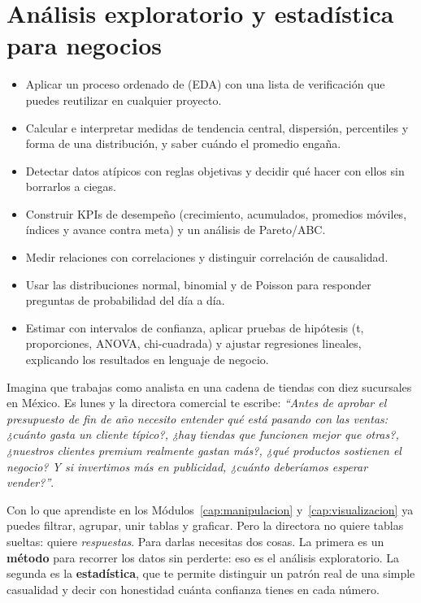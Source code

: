 \chapter{Análisis exploratorio y estadística para negocios}
\label{cap:eda}

\begin{objetivos}
\begin{itemize}
  \item Aplicar un proceso ordenado de 
        (EDA) con una lista de verificación que puedes reutilizar en cualquier
        proyecto.
  \item Calcular e interpretar medidas de tendencia central, dispersión,
        percentiles y forma de una distribución, y saber cuándo el promedio
        engaña.
  \item Detectar datos atípicos con reglas objetivas y decidir qué hacer con
        ellos sin borrarlos a ciegas.
  \item Construir KPIs de desempeño (crecimiento, acumulados, promedios
        móviles, índices y avance contra meta) y un análisis de Pareto/ABC.
  \item Medir relaciones con correlaciones y distinguir correlación de
        causalidad.
  \item Usar las distribuciones normal, binomial y de Poisson para responder
        preguntas de probabilidad del día a día.
  \item Estimar con intervalos de confianza, aplicar pruebas de hipótesis
        (t, proporciones, ANOVA, chi-cuadrada) y ajustar regresiones lineales,
        explicando los resultados en lenguaje de negocio.
\end{itemize}
\end{objetivos}

Imagina que trabajas como analista en una cadena de tiendas con diez
sucursales en México. Es lunes y la directora comercial te escribe:
\emph{``Antes de aprobar el presupuesto de fin de año necesito entender qué
está pasando con las ventas: ¿cuánto gasta un cliente típico?, ¿hay tiendas
que funcionen mejor que otras?, ¿nuestros clientes premium realmente gastan
más?, ¿qué productos sostienen el negocio? Y si invertimos más en publicidad,
¿cuánto deberíamos esperar vender?''}.

Con lo que aprendiste en los Módulos~\ref{cap:manipulacion}
y~\ref{cap:visualizacion} ya puedes filtrar, agrupar, unir tablas y graficar.
Pero la directora no quiere tablas sueltas: quiere \emph{respuestas}. Para
darlas necesitas dos cosas. La primera es un \textbf{método} para recorrer los
datos sin perderte: eso es el análisis exploratorio. La segunda es la
\textbf{estadística}, que te permite distinguir un patrón real de una simple
casualidad y decir con honestidad cuánta confianza tienes en cada número.

